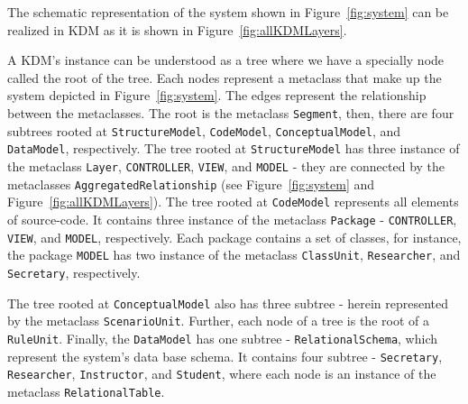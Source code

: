 The schematic representation of the system shown in Figure~\ref{fig:system} can be realized in KDM as it is shown in Figure~\ref{fig:allKDMLayers}. 


A KDM's instance can be understood as a tree where we have a specially node called the root of the tree. %
Each nodes represent a metaclass that make up the system depicted in Figure~\ref{fig:system}. The edges represent the relationship between the metaclasses.
%
%
%
The root is the metaclass \texttt{Segment}, then, there are four subtrees rooted at \texttt{StructureModel}, \texttt{CodeModel}, \texttt{ConceptualModel}, and \texttt{DataModel}, respectively. 
The tree rooted at \texttt{StructureModel} has three instance of the metaclass \texttt{Layer}, \texttt{CONTROLLER}, \texttt{VIEW}, and \texttt{MODEL} - they are connected by the metaclasses \texttt{AggregatedRelationship} (see Figure~\ref{fig:system} and Figure~\ref{fig:allKDMLayers}). The tree rooted at \texttt{CodeModel} represents all elements of source-code. It contains three instance of the metaclass \texttt{Package} - \texttt{CONTROLLER}, \texttt{VIEW}, and \texttt{MODEL}, respectively. Each package contains a set of classes, for instance, the package \texttt{MODEL} has two instance of the metaclass \texttt{ClassUnit}, \texttt{Researcher}, and \texttt{Secretary}, respectively.

The tree rooted at \texttt{ConceptualModel} also has three subtree - herein represented by the metaclass \texttt{ScenarioUnit}. Further, each node of a tree is the root of a \texttt{RuleUnit}. Finally, the \texttt{DataModel} has one subtree - \texttt{RelationalSchema}, which represent the system's data base schema. It contains four subtree - \texttt{Secretary}, \texttt{Researcher}, \texttt{Instructor}, and \texttt{Student}, where each node is an instance of the metaclass \texttt{RelationalTable}.

